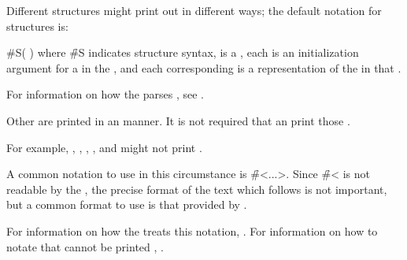 Different structures might print out in different ways;
the default notation for structures is:

\code
 #S( )
\endcode
where \f{\#S} indicates structure syntax,
 is a ,
each  is an initialization argument 
for a  in the ,
and each corresponding  is a representation
of the  in that .

For information on how the  parses ,
see \secref\SharpsignS.

\endsubsubsection%

Other  are printed in an  manner.
It is not required that an  print those 
.

For example, , 
	     ,
             ,
             ,
         and 
might not print .

A common notation to use in this circumstance is \f{\#<...>}.
Since \f{\#<} is not readable by the ,
the precise format of the text which follows is not important,
but a common format to use is that provided by .

For information on how the  treats this notation,
\seesection\SharpsignLeftAngle.
For information on how to notate  that cannot be printed ,
\seesection\SharpsignDot.

\endsubsubsection%

\endsubsection%



